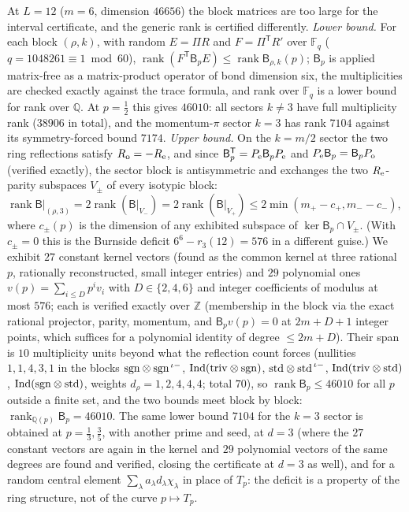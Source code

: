 \documentclass[aps,prx,reprint,superscriptaddress,nobibnotes,longbibliography]{revtex4-2}
\theoremstyle{remark}
\newcommand{\rk}{\operatorname{rank}}
\begin{document}
At $L=12$ ($m=6$, dimension $46656$) the block matrices are too large for the interval certificate, and the generic rank is certified differently.  \emph{Lower bound.} For each block $(\rho,k)$, with random $E=\Pi R$ and $F=\Pi^{\mathsf T}R'$ over $\mathbb F_q$ ($q=1048261\equiv1\bmod 60$), $\rk(F^{\mathsf T}\mathsf B_pE)\le\rk\mathsf B_{\rho,k}(p)$; $\mathsf B_p$ is applied matrix-free as a matrix-product operator of bond dimension six, the multiplicities are checked exactly against the trace formula, and rank over $\mathbb F_q$ is a lower bound for rank over $\mathbb Q$.  At $p=\tfrac12$ this gives $46010$: all sectors $k\ne3$ have full multiplicity rank ($38906$ in total), and the momentum-$\pi$ sector $k=3$ has rank $7104$ against its symmetry-forced bound $7174$.  \emph{Upper bound.} On the $k=m/2$ sector the two ring reflections satisfy $R_{\rm o}=-R_{\rm e}$, and since $\mathsf B_p^{\mathsf T}=P_{\rm e}\mathsf B_pP_{\rm e}$ and $P_{\rm e}\mathsf B_p=\mathsf B_pP_{\rm o}$ (verified exactly), the sector block is antisymmetric and exchanges the two $R_{\rm e}$-parity subspaces $V_\pm$ of every isotypic block: $\rk\mathsf B|_{(\rho,3)}=2\rk(\mathsf B|_{V_-})=2\rk(\mathsf B|_{V_+})\le2\min(m_+-c_+,m_--c_-)$, where $c_\pm(p)$ is the dimension of any exhibited subspace of $\ker\mathsf B_p\cap V_\pm$.  (With $c_\pm=0$ this is the Burnside deficit $6^6-r_3(12)=576$ in a different guise.)  We exhibit $27$ constant kernel vectors (found as the common kernel at three rational $p$, rationally reconstructed, small integer entries) and $29$ polynomial ones $v(p)=\sum_{i\le D}p^iv_i$ with $D\in\{2,4,6\}$ and integer coefficients of modulus at most $576$; each is verified exactly over $\mathbb Z$ (membership in the block via the exact rational projector, parity, momentum, and $\mathsf B_pv(p)=0$ at $2m+D+1$ integer points, which suffices for a polynomial identity of degree $\le2m+D$).  Their span is $10$ multiplicity units beyond what the reflection count forces (nullities $1,1,4,3,1$ in the blocks ${\rm sgn}\otimes{\rm sgn}^{\,\iota-}$, ${\rm Ind}({\rm triv}\otimes{\rm sgn})$, ${\rm std}\otimes{\rm std}^{\,\iota-}$, ${\rm Ind}({\rm triv}\otimes{\rm std})$, ${\rm Ind}({\rm sgn}\otimes{\rm std})$, weights $d_\rho=1,2,4,4,4$; total $70$), so $\rk\mathsf B_p\le46010$ for all $p$ outside a finite set, and the two bounds meet block by block: $\rk_{\mathbb Q(p)}\mathsf B_p=46010$.  The same lower bound $7104$ for the $k=3$ sector is obtained at $p=\tfrac13,\tfrac35$, with another prime and seed, at $d=3$ (where the $27$ constant vectors are again in the kernel and $29$ polynomial vectors of the same degrees are found and verified, closing the certificate at $d=3$ as well), and for a random central element $\sum_\lambda a_\lambda d_\lambda\chi_\lambda$ in place of $T_p$: the deficit is a property of the ring structure, not of the curve $p\mapsto T_p$.
\end{document}
